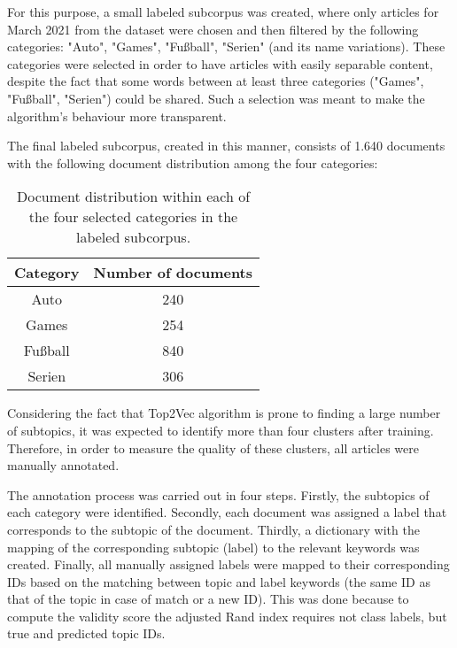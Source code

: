\documentclass[fontsize=12pt,a4paper,twoside,openany]{scrbook}
\begin{document}
For this purpose, a small labeled subcorpus was created, where only articles for March 2021 from the dataset were chosen and then filtered by the following categories: "Auto", "Games", "Fußball", "Serien" (and its name variations). These categories were selected in order to have articles with easily separable content, despite the fact that some words between at least three categories ("Games", "Fußball", "Serien") could be shared. Such a selection was meant to make the algorithm's behaviour more transparent.

The final labeled subcorpus, created in this manner, consists of 1.640 documents with the following document distribution among the four categories:

\begin{table}[ht]
    \centering
    \begin{tabular}{ |c|c| } 
        \hline
        \textbf{Category} & \textbf{Number of documents} \\
        \hline
        Auto & 240 \\
        \hline
        Games & 254 \\
        \hline
        Fußball & 840 \\
        \hline
        Serien & 306 \\
        \hline
    \end{tabular}
    \caption{Document distribution within each of the four selected categories in the labeled subcorpus.}
    \label{tab:doc_dist}
\end{table}

Considering the fact that Top2Vec algorithm is prone to finding a large number of subtopics, it was expected to identify more than four clusters after training. Therefore, in order to measure the quality of these clusters, all articles were manually annotated. 

The annotation process was carried out in four steps. Firstly, the subtopics of each category were identified. Secondly, each document was assigned a label that corresponds to the subtopic of the document. Thirdly, a dictionary with the mapping of the corresponding subtopic (label) to the relevant keywords was created. Finally, all manually assigned labels were mapped to their corresponding IDs based on the matching between topic and label keywords (the same ID as that of the topic in case of match or a new ID). This was done because to compute the validity score the adjusted Rand index requires not class labels, but true and predicted topic IDs.
\end{document}
